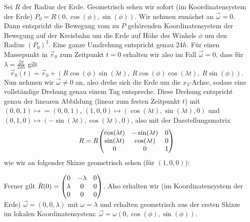 \documentclass{theozettel}
\begin{document}
Sei $R$ der Radius der Erde. Geometrisch sehen wir sofort (im Koordinatensystem der Erde) $P_{0} = R(0, \cos(\phi), \sin(\phi))$. Wir nehmen zunächst an $\vec{\omega} = 0$. Dann entspricht die Bewegung vom zu $P$ gehörenden Koordinatensystem der Bewegung auf der Kreisbahn um die Erde auf Höhe des Winkels $\phi$ um den Radius $(P_{0})^{2}$. Eine ganze Umdrehung entspricht genau $24 h$. Für einen Massepunkt in $\vec{r}_{0}$ zum Zeitpunkt $t = 0$ erhalten wir also im Fall $\vec{\omega} = 0$, dass für $\lambda = \frac{2\pi}{24h}$ gilt \[\vec{r}_{0}(t) = \vec{r}_{0} + (R\cos(\phi)\sin(\lambda t),\ R\cos(\phi)\cos(\lambda t), \ R\sin(\phi)  ).\]
Nun nehmen wir $\vec{\omega} \neq 0$ an, also drehe sich die Erde um die $x_{3}$-Achse, sodass eine vollständige Drehung genau einem Tag entspreche. Diese Drehung entspricht genau der linearen Abbildung (linear zum festen Zeitpunkt $t$) mit $(0,0,1) \mapsto = (0,0,1)$, $(1,0,0) \mapsto (\cos(\lambda t),\sin(\lambda t), 0)$ und $(0,1,0) \mapsto (-\sin(\lambda t), \cos(\lambda t), 0)$, also mit der Darstellungsmatrix \[R = R\mqty(\cos(\lambda t) & -\sin(\lambda t) & 0 \\ \sin(\lambda t) & \cos(\lambda t) & 0 \\ 0 & 0 & 1)\] wie wir an folgender Skizze geometrisch sehen (für $(1,0,0)$):
	\begin{figure}[H]
	\centering
	\end{figure}
Ferner gilt $\dot{R}(0) = \mqty(0 & -\lambda & 0 \\ \lambda & 0 & 0 \\0 & 0 &0)$. Also erhalten wir (im Koordinatensystem der Erde) $\vec{\omega} = (0,0,\lambda)$ mit $\omega = \lambda$ und erhalten geometrisch aus der ersten Skizze im lokalen Koordinatensystem: $\vec{\omega} = \omega (0, \cos(\phi), \sin(\phi))$. 
\end{document}
